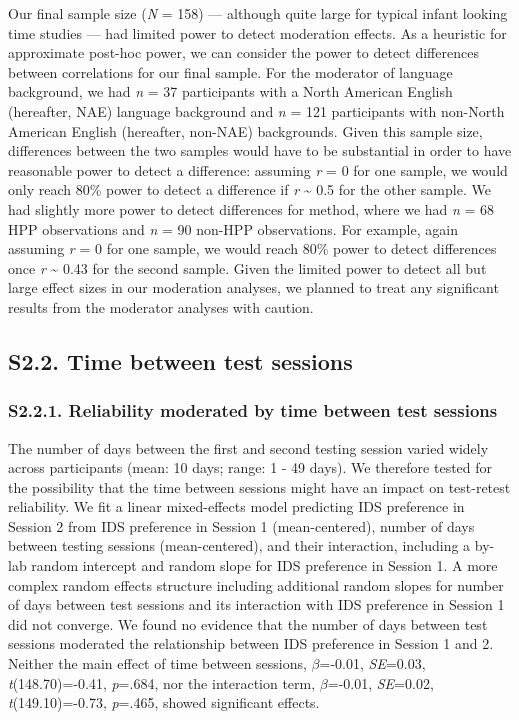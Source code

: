 \documentclass[
  man, donotrepeattitle,floatsintext]{apa6}
\begin{document}
Our final sample size (\emph{N} = 158) --- although quite large for typical infant looking time studies --- had limited power to detect moderation effects. As a heuristic for approximate post-hoc power, we can consider the power to detect differences between correlations for our final sample. For the moderator of language background, we had \emph{n} = 37 participants with a North American English (hereafter, NAE) language background and \emph{n} = 121 participants with non-North American English (hereafter, non-NAE) backgrounds. Given this sample size, differences between the two samples would have to be substantial in order to have reasonable power to detect a difference: assuming \emph{r} = 0 for one sample, we would only reach 80\% power to detect a difference if \emph{r} \textasciitilde{} 0.5 for the other sample. We had slightly more power to detect differences for method, where we had \emph{n} = 68 HPP observations and \emph{n} = 90 non-HPP observations. For example, again assuming \emph{r} = 0 for one sample, we would reach 80\% power to detect differences once \emph{r} \textasciitilde{} 0.43 for the second sample. Given the limited power to detect all but large effect sizes in our moderation analyses, we planned to treat any significant results from the moderator analyses with caution.

\hypertarget{s2.2.-time-between-test-sessions}{%
\subsection{S2.2. Time between test sessions}\label{s2.2.-time-between-test-sessions}}

\hypertarget{s2.2.1.-reliability-moderated-by-time-between-test-sessions}{%
\subsubsection{S2.2.1. Reliability moderated by time between test sessions}\label{s2.2.1.-reliability-moderated-by-time-between-test-sessions}}

The number of days between the first and second testing session varied widely across participants (mean: 10 days; range: 1 - 49 days). We therefore tested for the possibility that the time between sessions might have an impact on test-retest reliability. We fit a linear mixed-effects model predicting IDS preference in Session 2 from IDS preference in Session 1 (mean-centered), number of days between testing sessions (mean-centered), and their interaction, including a by-lab random intercept and random slope for IDS preference in Session 1.
A more complex random effects structure including additional random slopes for number of days between test sessions and its interaction with IDS preference in Session 1 did not converge.
We found no evidence that the number of days between test sessions moderated the relationship between IDS preference in Session 1 and 2. Neither the main effect of time between sessions, \(\beta\)=-0.01, \emph{SE}=0.03, \emph{t}(148.70)=-0.41, \emph{p}=.684, nor the interaction term, \(\beta\)=-0.01, \emph{SE}=0.02, \emph{t}(149.10)=-0.73, \emph{p}=.465, showed significant effects.
\end{document}
